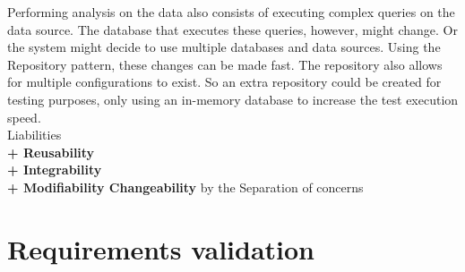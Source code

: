 Performing analysis on the data also consists of executing complex queries on the data source. The database that executes these queries, however, might change. Or the system might decide to use multiple databases and data sources.
Using the Repository pattern, these changes can be made fast. The repository also allows for multiple configurations to exist. So an extra repository could be created for testing purposes, only using an in-memory database to increase the test execution speed. \\

\textit{} Liabilities \\
\textbf{+ Reusability} \\
\textbf{+ Integrability} \\
\textbf{+ Modifiability Changeability} by the Separation of concerns\\


\section{Requirements validation}
\label{sec:req-validation}



